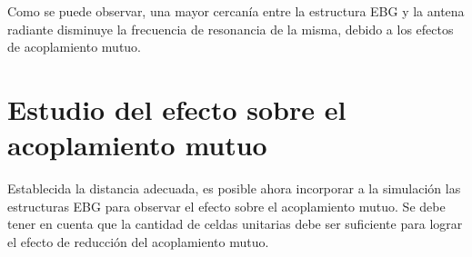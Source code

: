 Como se puede observar, una mayor cercanía entre la estructura EBG y la antena radiante disminuye la frecuencia de resonancia de la misma, debido a los efectos de acoplamiento mutuo.

\section{Estudio del efecto sobre el acoplamiento mutuo}
\label{sec_estudio_acoplam_mutuo}
Establecida la distancia adecuada, es posible ahora incorporar a la simulación las estructuras EBG para observar el efecto sobre el acoplamiento mutuo. Se debe tener en cuenta que la cantidad de celdas unitarias debe ser suficiente para lograr el efecto de reducción del acoplamiento mutuo.




